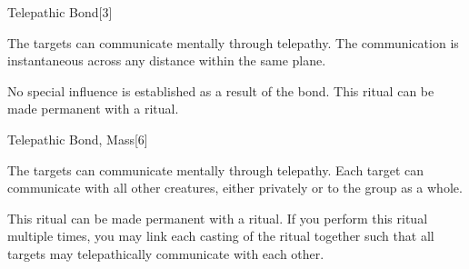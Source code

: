 \begin{spellsection}{Telepathic Bond}[3]
    \begin{spellheader}
    \end{spellheader}
    \begin{spellcontent}
        \begin{spelltargetinginfo}
            \spellrng{\rngclose}
        \end{spelltargetinginfo}
        \begin{spelleffects}

            \spellline
            \spelleffect The targets can communicate mentally through telepathy. The communication is instantaneous across any distance within the same plane.
            \spelldur \durext \dismissable
        \end{spelleffects}
    \end{spellcontent}
    \begin{spellfooter}
        \spellnotes No special influence is established as a result of the bond. This ritual can be made permanent with a  ritual.
    \end{spellfooter}
\end{spellsection}

\begin{spellsection}{Telepathic Bond, Mass}[6]
    \begin{spellheader}
    \end{spellheader}
    \begin{spellcontent}
        \begin{spelltargetinginfo}
        \end{spelltargetinginfo}
        \begin{spelleffects}

            \spellline
            \spelleffect The targets can communicate mentally through telepathy. Each target can communicate with all other creatures, either privately or to the group as a whole.
            \spelldur \durext \dismissable
        \end{spelleffects}
    \end{spellcontent}
    \begin{spellfooter}
        \spellnotes This ritual can be made permanent with a  ritual. If you perform this ritual multiple times, you may link each casting of the ritual together such that all targets may telepathically communicate with each other. 
    \end{spellfooter}
\end{spellsection}

